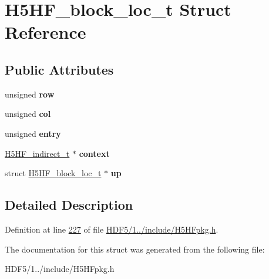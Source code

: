 \hypertarget{struct_h5_h_f__block__loc__t}{}\section{H5\+H\+F\+\_\+block\+\_\+loc\+\_\+t Struct Reference}
\label{struct_h5_h_f__block__loc__t}
\subsection*{Public Attributes}
\begin{DoxyCompactItemize}
\item 
\mbox{\label{struct_h5_h_f__block__loc__t_aa1cf9ac8ac7d383b5ccbce96e147e445}} 
unsigned {\bfseries row}
\item 
\mbox{\label{struct_h5_h_f__block__loc__t_ae712c2ba5126fa7ed6376b34ac24c2dc}} 
unsigned {\bfseries col}
\item 
\mbox{\label{struct_h5_h_f__block__loc__t_acd7e6d3afba0b7a7aa3f25873a1ccf24}} 
unsigned {\bfseries entry}
\item 
\mbox{\label{struct_h5_h_f__block__loc__t_a69afa442a724c57be1dc04ac3cdf2ceb}} 
\hyperlink{struct_h5_h_f__indirect__t}{H5\+H\+F\+\_\+indirect\+\_\+t} $\ast$ {\bfseries context}
\item 
\mbox{\label{struct_h5_h_f__block__loc__t_adf4729227b71878ffdf6c344e25c8d17}} 
struct \hyperlink{struct_h5_h_f__block__loc__t}{H5\+H\+F\+\_\+block\+\_\+loc\+\_\+t} $\ast$ {\bfseries up}
\end{DoxyCompactItemize}


\subsection{Detailed Description}


Definition at line \hyperlink{_h_d_f5_21_810_81_2include_2_h5_h_fpkg_8h_source_l00227}{227} of file \hyperlink{_h_d_f5_21_810_81_2include_2_h5_h_fpkg_8h_source}{H\+D\+F5/1../include/\+H5\+H\+Fpkg.\+h}.



The documentation for this struct was generated from the following file\+:\begin{DoxyCompactItemize}
\item 
H\+D\+F5/1../include/\+H5\+H\+Fpkg.\+h\end{DoxyCompactItemize}
